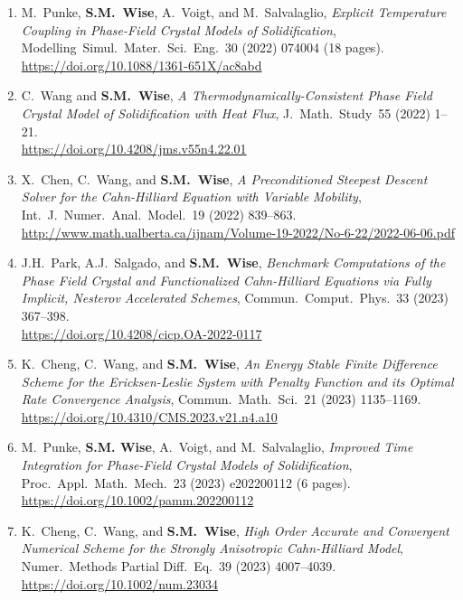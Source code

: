 \documentclass[11pt]{letter}
\begin{document}
\begin{enumerate}
\url{https://doi.org/10.4208/aamm.OA-2021-0331}

	\item
M.~Punke, \textbf{S.M.~Wise}, A.~Voigt, and M.~Salvalaglio, {\sl  Explicit Temperature Coupling in Phase-Field Crystal Models of Solidification}, Modelling~Simul.~Mater.~Sci.~Eng.~30 (2022) 074004 (18 pages).
	\\ 
\url{https://doi.org/10.1088/1361-651X/ac8abd}

	\item
C.~Wang  and \textbf{S.M.~Wise}, {\sl A Thermodynamically-Consistent Phase Field Crystal Model of Solidification with Heat Flux}, J.~Math.~Study~55 (2022) 1--21.
	\\
\url{https://doi.org/10.4208/jms.v55n4.22.01}

	\item
X.~Chen, C.~Wang, and \textbf{S.M.~Wise}, {\sl A Preconditioned Steepest Descent Solver for the Cahn-Hilliard Equation with Variable Mobility}, Int.~J.~Numer.~Anal.~Model.~19 (2022) 839--863.
	\\
\url{http://www.math.ualberta.ca/ijnam/Volume-19-2022/No-6-22/2022-06-06.pdf}

	\item
J.H.~Park, A.J.~Salgado, and \textbf{S.M.~Wise}, {\sl Benchmark Computations of the Phase Field Crystal and Functionalized Cahn-Hilliard Equations via Fully Implicit, Nesterov Accelerated Schemes}, Commun.~Comput.~Phys.~33 (2023) 367--398.
	\\
\url{https://doi.org/10.4208/cicp.OA-2022-0117}

	\item
K.~Cheng, C.~Wang, and \textbf{S.M.~Wise}, {\sl An Energy Stable Finite Difference Scheme for the Ericksen-Leslie System with Penalty Function and its Optimal Rate Convergence Analysis}, Commun.~Math.~Sci.~21 (2023)  1135--1169.
	\\
\url{https://doi.org/10.4310/CMS.2023.v21.n4.a10}

	\item
M.~Punke, \textbf{S.M. Wise}, A.~Voigt, and M.~Salvalaglio, {\sl Improved Time Integration for Phase-Field Crystal Models of Solidification}, Proc.~Appl.~Math.~Mech.~23 (2023) e202200112 (6 pages).
	\\
\url{https://doi.org/10.1002/pamm.202200112}

	\item
K.~Cheng, C.~Wang, and \textbf{S.M.~Wise}, {\sl High Order Accurate and Convergent Numerical Scheme for the Strongly Anisotropic Cahn-Hilliard Model}, Numer.~Methods Partial Diff.~Eq.~39 (2023) 4007--4039.
	\\
\url{https://doi.org/10.1002/num.23034}


\end{enumerate}
\end{document}

